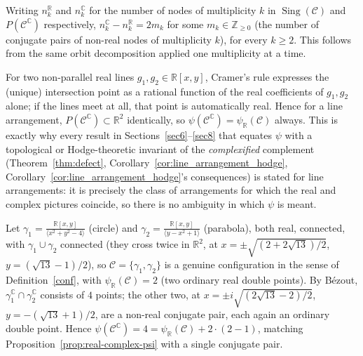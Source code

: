 \documentclass[article,11pt]{amsart} \numberwithin{equation}{section}
\numberwithin{equation}{section}
\begin{document}
{\begin{cor}\label{refi}
	Writing $n_k^\mathbb R$ and $n_k^\mathbb C$ for the number of nodes of multiplicity $k$ in
	$\operatorname{Sing}(\mathcal C)$ and $P(\mathcal C^\mathbb C)$ respectively, $n_k^\mathbb C-n_k^\mathbb R=2m_k$
	for some $m_k\in\mathbb Z_{\ge0}$ (the number of conjugate pairs of non-real nodes
	of multiplicity $k$), for every $k\ge2$. This follows from the same orbit
	decomposition applied one multiplicity at a time.
\end{cor}

\begin{rk}
	\label{rem:lines-no-gap}
	For two non-parallel real lines $g_1,g_2\in\mathbb R[x,y]$, Cramer's rule expresses
	the (unique) intersection point as a rational function of the real
	coefficients of $g_1,g_2$ alone; if the lines meet at all, that point is
	automatically real. Hence for a line arrangement, $P(\mathcal
	C^\mathbb C)\subset\mathbb R^2$ identically, so $\psi(\mathcal C^\mathbb C)=\psi_\mathbb R(\mathcal C)$
	always. This is exactly why every result in Sections~\ref{sec6}--\ref{sec8} that equates
	$\psi$ with a topological or Hodge-theoretic invariant of the
	\emph{complexified} complement (Theorem~\ref{thm:defect}, Corollary~\ref{cor:line_arrangement_hodge}, Corollary~\ref{cor:line_arrangement_hodge}'s
	consequences) is stated for line arrangements: it is precisely the class of
	arrangements for which the real and complex pictures coincide, so there is
	no ambiguity in which $\psi$ is meant.
\end{rk}

\begin{ex}
	\label{ex:real-complex-gap}
	Let $\gamma_1=\frac{\mathbb R [x,y]}{\langle x^2+y^2-4\rangle}  $ (circle) and $\gamma_2=\frac{\mathbb R [x,y]}{\langle y-x^2+1\rangle} $ (parabola),
	both real, connected, with $\gamma_1\cup\gamma_2$ connected (they cross
	twice in $\mathbb R^2$, at $x=\pm\sqrt{(2+2\sqrt{13})/2}$, $y=(\sqrt{13}-1)/2$), so
	$\mathcal C=\{\gamma_1,\gamma_2\}$ is a genuine configuration in the sense of
	Definition~\ref{conf}, with $\psi_\mathbb R(\mathcal C)=2$ (two ordinary real double
	points). By B\'ezout, $\gamma_1^\mathbb C\cap\gamma_2^\mathbb C$ consists of $4$ points;
	the other two, at $x=\pm i\sqrt{(2\sqrt{13}-2)/2}$, $y=-(\sqrt{13}+1)/2$, are
	a non-real conjugate pair, each again an ordinary double point. Hence
	$\psi(\mathcal C^\mathbb C)=4=\psi_\mathbb R(\mathcal C)+2\cdot(2-1)$, matching
	Proposition~\ref{prop:real-complex-psi} with a single conjugate pair.
\end{ex}

}
\end{document}

